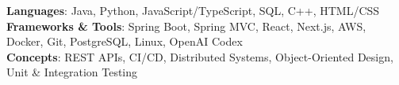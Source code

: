 \begin{itemize}[leftmargin=0.15in, label={}]
  \small{\item{
    \textbf{Languages}{: Java, Python, JavaScript/TypeScript, SQL, C++, HTML/CSS} \\
    \textbf{Frameworks \& Tools}{: Spring Boot, Spring MVC, React, Next.js, AWS, Docker, Git, PostgreSQL, Linux, OpenAI Codex} \\
    \textbf{Concepts}{: REST APIs, CI/CD, Distributed Systems, Object-Oriented Design, Unit \& Integration Testing}
  }}
\end{itemize}
